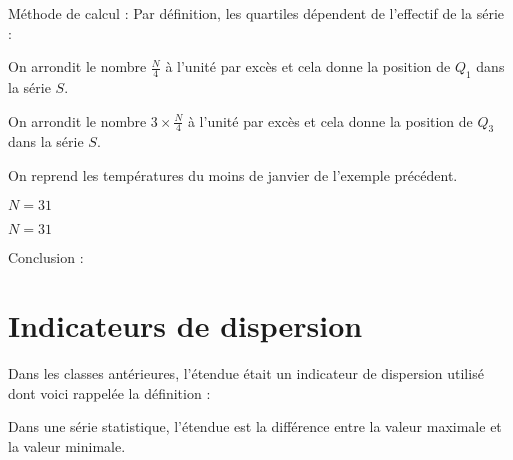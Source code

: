 \documentclass[xcolor={dvipsnames,svgnames,table}]{beamer}
\begin{document}
\begin{frame}{Méthode de calcul :}
\pause
Par définition, les quartiles dépendent de l'effectif de la série :\pause
\begin{description}[<+->]
    \item[Premier quartile :] On arrondit le nombre $\frac{N}{4}$ à l'unité par excès et cela donne la position de $Q_1$ dans la série $S$.
    \item[Troisième quartile :] On arrondit le nombre $3\times\frac{N}{4}$ à l'unité par excès et cela donne la position de $Q_3$ dans la série $S$.
\end{description}
\end{frame}

\begin{frame}
    \begin{Example}
        On reprend les températures du moins de janvier de l'exemple précédent.\pause
        \begin{description}[<+->]
            \item[Premier quartile :] $N = 31$ 
            \item[Troisième quartile :] $N = 31$ 
        \end{description}\pause
        Conclusion :\par
    \end{Example}
\end{frame}

\section{Indicateurs de dispersion}

\begin{frame}
Dans les classes antérieures, l'\alert{étendue} était un indicateur de dispersion utilisé dont voici rappelée la définition :

\begin{Definition}
    Dans une série statistique, l'\alert{étendue} est la différence entre la valeur maximale et la valeur minimale.
\end{Definition}
\end{frame}
\end{document}
